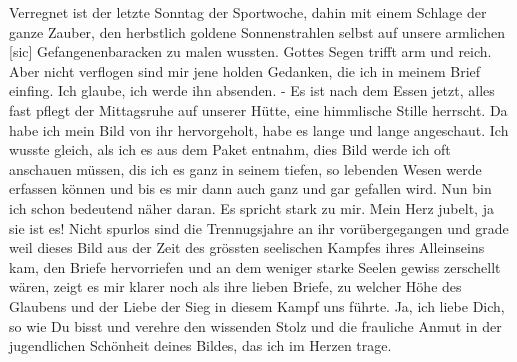 \def\day{5. September 1943}
\mktitle

Verregnet ist der letzte Sonntag der Sportwoche, dahin mit einem Schlage der ganze Zauber, den herbstlich goldene Sonnenstrahlen selbst auf unsere armlichen{\color{red} [sic] } Gefangenenbaracken zu malen wussten.
Gottes Segen trifft arm und reich.
Aber nicht verflogen sind mir jene holden Gedanken, die ich in meinem Brief einfing.
Ich glaube, ich werde ihn absenden.
- Es ist nach dem Essen jetzt, alles fast pflegt der Mittagsruhe auf unserer H\"{u}tte, eine himmlische Stille herrscht.
Da habe ich mein Bild von ihr hervorgeholt, habe es lange und lange angeschaut.
Ich wusste gleich, als ich es aus dem Paket entnahm, dies Bild werde ich oft anschauen m\"{u}ssen, dis ich es ganz in seinem tiefen, so lebenden Wesen werde erfassen k\"{o}nnen und bis es mir dann auch ganz und gar gefallen wird.
Nun bin ich schon bedeutend n\"{a}her daran.
Es spricht stark zu mir.
Mein Herz jubelt, ja sie ist es!
Nicht spurlos sind die Trennugsjahre an ihr vor\"{u}bergegangen und grade weil dieses Bild aus der Zeit des gr\"{o}ssten seelischen Kampfes ihres Alleinseins kam, den Briefe hervorriefen und an dem weniger starke Seelen gewiss zerschellt w\"{a}ren, zeigt es mir klarer noch als ihre lieben Briefe, zu welcher H\"{o}he des Glaubens und der Liebe der Sieg in diesem Kampf uns f\"{u}hrte.
Ja, ich liebe Dich, so wie Du bisst und verehre den wissenden Stolz und die frauliche Anmut in der jugendlichen Sch\"{o}nheit deines Bildes, das ich im Herzen trage.

\clearpage
